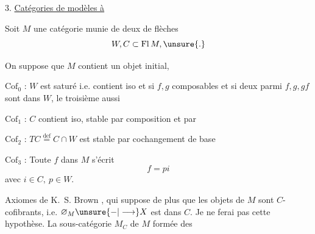 
3. \uline{Catégories de modèles à }

Soit $M$ une catégorie munie de deux  de flèches
\[
 W,C\subset\mathrm{Fl}\,M,\unsure{.}
\]

On suppose que $M$ contient un objet initial, 

 $\mathrm{Cof}_{0}$ : $W$ est  saturé i.e. contient iso et si $f,g$ composables et si deux parmi $f,g,gf$ sont dans $W$, le troisième aussi

$\mathrm{Cof}_{1}$ : $C$ contient iso, stable par composition et par  

$\mathrm{Cof}_{2}$ : $TC\overset{\mathrm{def}}{=}C\cap W$ est stable par cochangement de base

$\mathrm{Cof}_{3}$ : Toute  $f$ dans $M$ s'écrit
\[
 f=pi
\]
avec $i\in C,\ p\in W$.

 Axiomes de K.~S. Brown , qui suppose de plus que les objets de $M$ sont $C$-cofibrants, i.e. $\varnothing_M\unsure{\mathbin{-}|\longrightarrow} X$ est dans $C$. Je ne ferai pas cette hypothèse. La sous-catégorie $M_C$  de $M$ formée des
